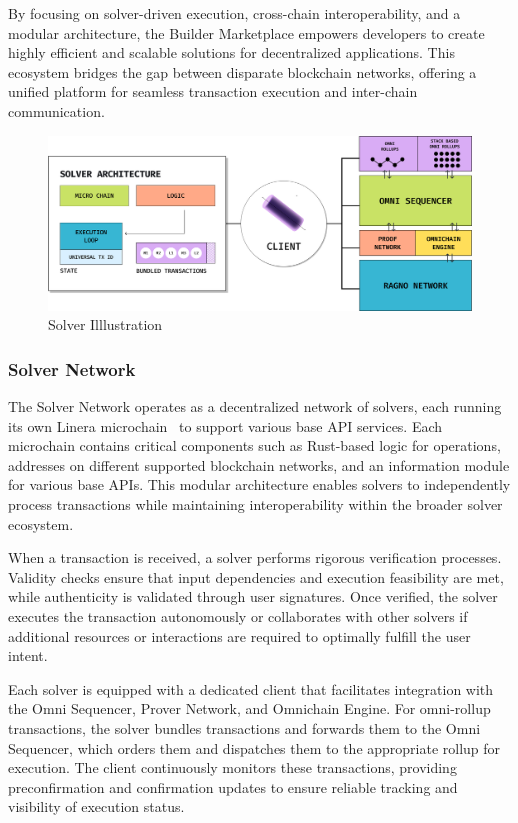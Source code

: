 By focusing on solver-driven execution, cross-chain interoperability, and a modular architecture, the Builder Marketplace empowers developers to create highly efficient and scalable solutions for decentralized applications. This ecosystem bridges the gap between disparate blockchain networks, offering a unified platform for seamless transaction execution and inter-chain communication.

\begin{figure}[h]
    \centering
    \includegraphics[width=0.9\linewidth]{figure/solver.png}
    \caption{Solver Illlustration}
    \label{fig:solver}
\end{figure}

\subsubsection{Solver Network}
The Solver Network operates as a decentralized network of solvers, each running its own Linera microchain~\cite{linera} to support various base API services. Each microchain contains critical components such as Rust-based logic for operations, addresses on different supported blockchain networks, and an information module for various base APIs. This modular architecture enables solvers to independently process transactions while maintaining interoperability within the broader solver ecosystem.

When a transaction is received, a solver performs rigorous verification processes. Validity checks ensure that input dependencies and execution feasibility are met, while authenticity is validated through user signatures. Once verified, the solver executes the transaction autonomously or collaborates with other solvers if additional resources or interactions are required to optimally fulfill the user intent.

Each solver is equipped with a dedicated client that facilitates integration with the Omni Sequencer, Prover Network, and Omnichain Engine. For omni-rollup transactions, the solver bundles transactions and forwards them to the Omni Sequencer, which orders them and dispatches them to the appropriate rollup for execution. The client continuously monitors these transactions, providing preconfirmation and confirmation updates to ensure reliable tracking and visibility of execution status.

